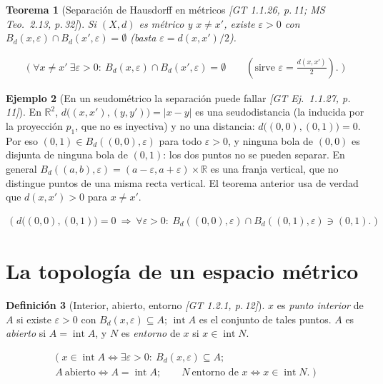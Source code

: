 \documentclass[11pt,a4paper]{article}
\newcommand{\lgc}[1]{\par\vspace{-3pt}\begin{gather*}\big(\;#1\;\big)\end{gather*}\vspace{-6pt}}
\theoremstyle{definition}
\newtheorem{definicion}{Definición}[section]
\newtheorem{ejemplo}[definicion]{Ejemplo}
\theoremstyle{plain}
\newtheorem{teorema}[definicion]{Teorema}
\newcommand{\fnt}[1]{{\normalfont\small\itshape\color{gray!150!black}[#1]}}
\newcommand{\R}{\mathbb{R}}
\newcommand{\intr}{\operatorname{int}}
\newcommand{\Bola}[2]{B_d(#1,#2)}
\begin{document}
\begin{teorema}[Separación de Hausdorff en métricos \fnt{GT 1.1.26, p.\,11; MS Teo.\ 2.13, p.\,32}]
Si $(X,d)$ es métrico y $x\ne x'$, existe $\varepsilon>0$ con $\Bola{x}{\varepsilon}\cap\Bola{x'}{\varepsilon}=\emptyset$ (basta $\varepsilon=d(x,x')/2$).
\lgc{\forall x\ne x'\ \exists\varepsilon>0:\ \Bola{x}{\varepsilon}\cap\Bola{x'}{\varepsilon}=\emptyset\qquad(\text{sirve } \varepsilon=\tfrac{d(x,x')}{2}).}
\end{teorema}

\begin{ejemplo}[En un seudométrico la separación puede fallar \fnt{GT Ej.\ 1.1.27, p.\,11}]\label{hu:seudoR2}
En $\R^2$, $d\big((x,x'),(y,y')\big)=|x-y|$ es una seudodistancia (la inducida por la proyección $p_1$, que no es inyectiva) y no una distancia: $d\big((0,0),(0,1)\big)=0$. Por eso $(0,1)\in\Bola{(0,0)}{\varepsilon}$ para todo $\varepsilon>0$, y ninguna bola de $(0,0)$ es disjunta de ninguna bola de $(0,1)$: los dos puntos no se pueden separar. En general $\Bola{(a,b)}{\varepsilon}=(a-\varepsilon,a+\varepsilon)\times\R$ es una franja vertical, que no distingue puntos de una misma recta vertical. El teorema anterior usa de verdad que $d(x,x')>0$ para $x\ne x'$.
\lgc{d\big((0,0),(0,1)\big)=0\ \Rightarrow\ \forall\varepsilon>0:\ \Bola{(0,0)}{\varepsilon}\cap\Bola{(0,1)}{\varepsilon}\ni(0,1).}
\end{ejemplo}



\section{La topología de un espacio métrico}\label{sec:topmet}

\begin{definicion}[Interior, abierto, entorno \fnt{GT 1.2.1, p.\,12}]
$x$ es \emph{punto interior} de $A$ si existe $\varepsilon>0$ con $\Bola{x}{\varepsilon}\subseteq A$; $\intr A$ es el conjunto de tales puntos. $A$ es \emph{abierto} si $A=\intr A$, y $N$ es \emph{entorno} de $x$ si $x\in\intr N$.
\lgc{x\in\intr A\iff \exists\varepsilon>0:\ \Bola{x}{\varepsilon}\subseteq A;\\
A\ \text{abierto}\iff A=\intr A;\qquad N\ \text{entorno de } x\iff x\in\intr N.}
\end{definicion}
\end{document}
